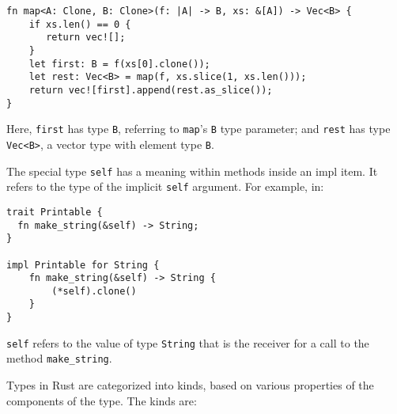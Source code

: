\documentclass[]{article}
\begin{document}
\begin{verbatim}
fn map<A: Clone, B: Clone>(f: |A| -> B, xs: &[A]) -> Vec<B> {
    if xs.len() == 0 {
       return vec![];
    }
    let first: B = f(xs[0].clone());
    let rest: Vec<B> = map(f, xs.slice(1, xs.len()));
    return vec![first].append(rest.as_slice());
}
\end{verbatim}

Here, \texttt{first} has type \texttt{B}, referring to \texttt{map}'s
\texttt{B} type parameter; and \texttt{rest} has type
\texttt{Vec\textless{}B\textgreater{}}, a vector type with element type
\texttt{B}.


The special type \texttt{self} has a meaning within methods inside an
impl item. It refers to the type of the implicit \texttt{self} argument.
For example, in:

\begin{verbatim}
trait Printable {
  fn make_string(&self) -> String;
}

impl Printable for String {
    fn make_string(&self) -> String {
        (*self).clone()
    }
}
\end{verbatim}

\texttt{self} refers to the value of type \texttt{String} that is the
receiver for a call to the method \texttt{make\_string}.


Types in Rust are categorized into kinds, based on various properties of
the components of the type. The kinds are:
\end{document}
